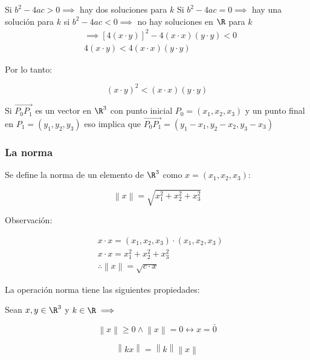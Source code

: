 \begin{exercise}
	Si $b^2-4ac>0\implies $ hay dos soluciones para $k$
	Si $b^2-4ac=0\implies $ hay una solución para $k$
	si $b^2-4ac<0\implies $ no hay soluciones en $\R$ para $k$
	\begin{align*}
		 & \implies \left[4(x\cdot y)\right]^2-4(x\cdot x)(y\cdot y)<0 \\
		 & 4(x\cdot y)<4(x\cdot x)(y\cdot y)
	\end{align*}

	Por lo tanto:

	\begin{equation*}
		\left(x\cdot y\right)^2<(x\cdot x)(y\cdot y)
	\end{equation*}
\end{exercise}

\begin{definition}
	Si $\overrightarrow{P_0P_1}$ es un vector en $\R^3$ con punto inicial $P_0=\left(x_1,x_2,x_3\right)$ y un punto final en
	$P_1=\left(y_1,y_2,y_3\right)$ eso implica que $\overrightarrow{P_0P_1}=\left(y_1-x_1,y_2-x_2,y_3-x_3\right)$
\end{definition}

\subsubsection{La norma}
Se  define la norma de un elemento de $\R^3$ como $x=\left(x_1,x_2,x_3 \right)$:

\begin{equation}
	\left\lVert x \right\rVert=\sqrt{x^2_1+x^2_2+x^2_3}
\end{equation}

Observación:

\begin{align*}
	 & x\cdot x=\left(x_1,x_2,x_3\right)\cdot \left(x_1,x_2,x_3\right) \\
	 & x\cdot x=x^2_1+x^2_2+x^2_3                                      \\
	 & \therefore \left\lVert x \right\rVert=\sqrt{c\cdot x}
\end{align*}

La operación norma tiene las siguientes propiedades:

Sean $x,y\in \R^3$ y $k\in \R\implies$

\begin{equation}
	\left\lVert x \right\rVert\geq 0\land \left\lVert x \right\rVert=0\longleftrightarrow x=\bar{0}
\end{equation}

\begin{equation}
	\left\lVert kx \right\rVert=\left\lVert k \right\rVert\left\lVert x \right\rVert
\end{equation}

